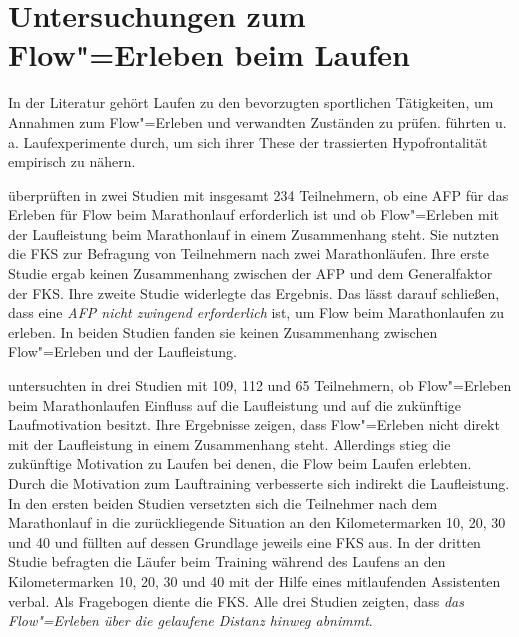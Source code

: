 

\section{Untersuchungen zum Flow"=Erleben beim Laufen} 

\label{sec:untersuchungen_zum_flow_erleben_beim_laufen}

In der Literatur gehört Laufen zu den bevorzugten sportlichen Tätigkeiten, um Annahmen zum Flow"=Erleben und verwandten Zuständen zu prüfen. \citet{Dietrich2004a} führten u. a. Laufexperimente durch, um sich ihrer These der trassierten Hypofrontalität empirisch zu nähern. 

\citet{Stoll2005} überprüften in zwei Studien mit insgesamt 234 Teilnehmern, ob eine \ac{AFP} für das Erleben für Flow beim Marathonlauf erforderlich ist und ob Flow"=Erleben mit der Laufleistung beim Marathonlauf in einem Zusammenhang steht. Sie nutzten die \ac{FKS} zur Befragung von Teilnehmern nach zwei Marathonläufen. Ihre erste Studie ergab keinen Zusammenhang zwischen der \ac{AFP} und dem Generalfaktor der \ac{FKS}. Ihre zweite Studie widerlegte das Ergebnis. Das lässt \citet{Stoll2005} darauf schließen, dass eine \emph{\ac{AFP} nicht zwingend erforderlich} ist, um Flow beim Marathonlaufen zu erleben. In beiden Studien fanden sie keinen Zusammenhang zwischen Flow"=Erleben und der Laufleistung. 

\citet{Schuler2009} untersuchten in drei Studien mit 109, 112 und 65 Teilnehmern, ob Flow"=Erleben beim Marathonlaufen Einfluss auf die Laufleistung und auf die zukünftige Laufmotivation besitzt. Ihre Ergebnisse zeigen, dass Flow"=Erleben nicht direkt mit der Laufleistung in einem Zusammenhang steht. Allerdings stieg die zukünftige Motivation zu Laufen bei denen, die Flow beim Laufen erlebten. Durch die Motivation zum Lauftraining verbesserte sich indirekt die Laufleistung. In den ersten beiden Studien versetzten sich die Teilnehmer nach dem Marathonlauf in die zurückliegende Situation an den Kilometermarken 10, 20, 30 und 40 und füllten auf dessen Grundlage jeweils eine \ac{FKS} aus. In der dritten Studie befragten \citet{Schuler2009} die Läufer beim Training während des Laufens an den Kilometermarken 10, 20, 30 und 40 mit der Hilfe eines mitlaufenden Assistenten verbal. Als Fragebogen diente die \ac{FKS}. Alle drei Studien zeigten, dass \emph{das Flow"=Erleben über die gelaufene Distanz hinweg abnimmt}. 


